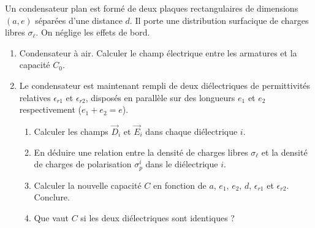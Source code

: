 \documentclass[12pt,a4paper]{article}
\begin{document}
\begin{boiteexercice}
Un condensateur plan est formé de deux plaques rectangulaires de dimensions $(a, e)$ séparées d'une distance $d$. Il porte une distribution surfacique de charges libres $\sigma_\ell$. On néglige les effets de bord.
\begin{enumerate}
  \item Condensateur à air. Calculer le champ électrique entre les armatures et la capacité $C_0$.
  \item Le condensateur est maintenant rempli de deux diélectriques de permittivités relatives $\epsilon_{r1}$ et $\epsilon_{r2}$, disposés en parallèle sur des longueurs $e_1$ et $e_2$ respectivement ($e_1+e_2=e$).
  \begin{enumerate}[label=\alph*)]
    \item Calculer les champs $\vec{D}_i$ et $\vec{E}_i$ dans chaque diélectrique $i$.
    \item En déduire une relation entre la densité de charges libres $\sigma_\ell$ et la densité de charges de polarisation $\sigma_p^i$ dans le diélectrique $i$.
    \item Calculer la nouvelle capacité $C$ en fonction de $a$, $e_1$, $e_2$, $d$, $\epsilon_{r1}$ et $\epsilon_{r2}$. Conclure.
    \item Que vaut $C$ si les deux diélectriques sont identiques ?
  \end{enumerate}
\end{enumerate}
\end{boiteexercice}
\end{document}
